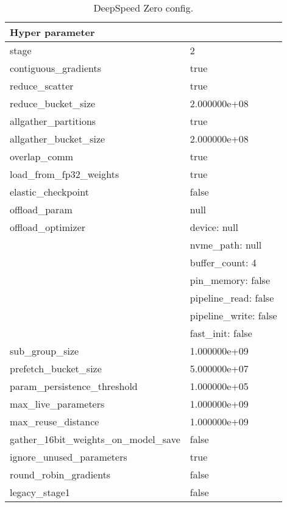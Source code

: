 \begin{table}
    \def\arraystretch{1.5}
    \small
    \centering
    \caption{DeepSpeed Zero config.}
    \label{tab:inclusion-exclusion-criteria}
    \begin{tabularx}{\textwidth}{XX}
        \toprule
        \textbf{Hyper parameter} & \\
        \midrule
        stage & 2\\
        contiguous\_gradients & true\\
        reduce\_scatter & true\\
        reduce\_bucket\_size & 2.000000e+08\\
        allgather\_partitions & true\\
        allgather\_bucket\_size & 2.000000e+08\\
        overlap\_comm & true\\
        load\_from\_fp32\_weights & true\\
        elastic\_checkpoint & false\\
        offload\_param & null\\
        \midrule
        offload\_optimizer & device: null\\
        & nvme\_path: null\\
        & buffer\_count: 4\\
        & pin\_memory: false\\
        & pipeline\_read: false\\
        & pipeline\_write: false\\
        & fast\_init: false\\
        \midrule
        sub\_group\_size & 1.000000e+09\\
        prefetch\_bucket\_size & 5.000000e+07\\
        param\_persistence\_threshold & 1.000000e+05\\
        max\_live\_parameters & 1.000000e+09\\
        max\_reuse\_distance & 1.000000e+09\\
        gather\_16bit\_weights\_on\_model\_save & false\\
        ignore\_unused\_parameters & true\\
        round\_robin\_gradients & false\\
        legacy\_stage1 & false\\
        \bottomrule
    \end{tabularx}
\end{table}



